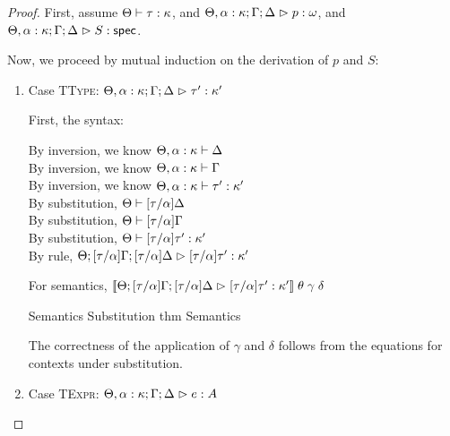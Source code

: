 \begin{proof}
First, assume $\judgeWK{\tau}{\kappa}$, and $\judgeA[\Theta, \alpha:\kappa; \Gamma;\Delta]{p}{\omega}$, and
$\judgeS[\Theta, \alpha:\kappa; \Gamma; \Delta]{S}$. 

Now, we proceed by mutual induction on the derivation of $p$ and $S$: 
\begin{enumerate}

\item Case \textsc{TType}: $\judgeA[\Theta, \alpha:\kappa; \Gamma;\Delta]{\tau'}{\kappa'}$

  First, the syntax:
  \begin{tabbedproof}
    \oo By inversion, we know $\judgectx{\Theta, \alpha:\kappa}{\Delta}$ \\
    \oo By inversion, we know $\judgectx{\Theta, \alpha:\kappa}{\Gamma}$ \\
    \oo By inversion, we know $\judgeWK[\Theta, \alpha:\kappa]{\tau'}{\kappa'}$ \\
    \oo By substitution, $\judgectx{\Theta}{{[\tau/\alpha]}\Delta}$ \\
    \oo By substitution, $\judgectx{\Theta}{{[\tau/\alpha]}\Gamma}$ \\
    \oo By substitution, $\judgeWK{{[\tau/\alpha]}\tau'}{\kappa'}$ \\
    \oo By rule, $\judgeA[\Theta; {[\tau/\alpha]}\Gamma;{[\tau/\alpha]}\Delta]{{[\tau/\alpha]}\tau'}{\kappa'}$
  \end{tabbedproof}

  For semantics,     $\interp{\judgeA[\Theta; {[\tau/\alpha]}\Gamma;{[\tau/\alpha]}\Delta]{{[\tau/\alpha]}\tau'}{\kappa'}}\;\theta\;\gamma\;\delta$
  \begin{eqnproof}
          {Semantics}
          {Substitution thm}
          {Semantics}
  \end{eqnproof}
  The correctness of the application of $\gamma$ and $\delta$ follows from the equations for contexts
  under substitution. 

  \item Case \textsc{TExpr}: $\judgeA[\Theta, \alpha:\kappa; \Gamma; \Delta]{e}{A}$


\end{enumerate}
\end{proof}
